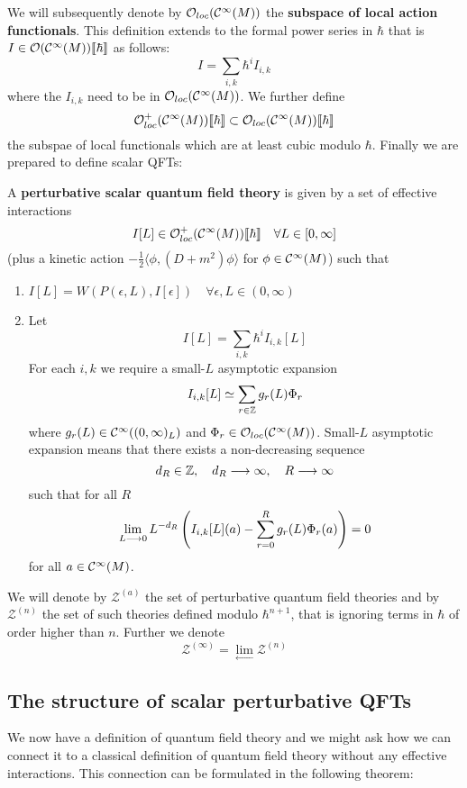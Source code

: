 We will subsequently denote by $\mathcal{O}_{loc}(\mathcal{C}^{\infty}(M))$ the \textbf{subspace of local action functionals}. This definition extends to the formal power series in $\hbar$ that is $I \in \mathcal{O}(\mathcal{C}^{\infty}(M))\llbracket \hbar \rrbracket$ as follows:
$$ I = \sum_{i,k} \hbar^i I_{i,k} $$
where the $I_{i,k}$ need to be in $\mathcal{O}_{loc}(\mathcal{C}^{\infty}(M))$. We further define
$$ \mathcal{O}^+_{loc}(\mathcal{C}^{\infty}(M))\llbracket \hbar \rrbracket \subset \mathcal{O}_{loc}(\mathcal{C}^{\infty}(M))\llbracket \hbar \rrbracket $$
the subspae of local functionals which are at least cubic modulo $\hbar$. Finally we are prepared to define scalar QFTs:

\begin{definition}
\label{def:PSQFTs}
  A \textbf{perturbative scalar quantum field theory} is given by a set of effective interactions
  $$ I[L] \in \mathcal{O}^+_{loc}(\mathcal{C}^{\infty}(M))\llbracket \hbar \rrbracket \quad \forall L \in [0, \infty] $$
  (plus a kinetic action $- \frac{1}{2} \langle \phi, (D + m^2) \phi \rangle$ for $\phi \in \Ci(M)$) such that
  \begin{enumerate}
    \item $I[L] = W(P(\epsilon, L), I[\epsilon]) \quad \forall \epsilon,L \in (0,\infty)$

    \item Let
    $$ I[L] = \sum_{i,k} \hbar^i I_{i,k}[L] $$
    For each $i,k$ we require a small-$L$ asymptotic expansion
    $$ I_{i,k}[L] \simeq \sum_{r \in \mathbb{Z}} g_r(L) \Phi_r $$
    where $g_r(L) \in \mathcal{C}^{\infty}((0,\infty)_L)$ and $\Phi_r \in \mathcal{O}_{loc}(\mathcal{C}^{\infty}(M))$. Small-$L$ asymptotic expansion means that there exists a non-decreasing sequence
    $$ d_R \in \mathbb{Z}, \quad d_R \longrightarrow \infty, \quad R\longrightarrow \infty $$
    such that for all $R$
    $$ \lim_{L \longrightarrow 0} L^{-d_R} \left( I_{i,k}[L](a) - \sum_{r=0}^R g_r(L) \Phi_r(a) \right) = 0 $$
    for all $a \in \mathcal{C}^{\infty}(M)$.
  \end{enumerate}
  We will denote by $\mathcal{Z}^{(a)}$ the set of perturbative quantum field theories and by $\mathcal{Z}^{(n)}$ the set of such theories defined modulo $\hbar^{n+1}$, that is ignoring terms in $\hbar$ of order higher than $n$. Further we denote
  $$ \mathcal{Z}^{(\infty)} = \lim_{\longleftarrow} \mathcal{Z}^{(n)} $$
\end{definition}

\subsection{The structure of scalar perturbative QFTs}

We now have a definition of quantum field theory and we might ask how we can connect it to a classical definition of quantum field theory without any effective interactions. This connection can be formulated in the following theorem:

